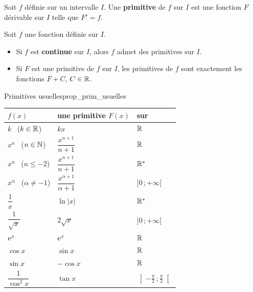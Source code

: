 \begin{definition}
	Soit $f$ définie sur un intervalle $I$. Une \textbf{primitive} de $f$
	sur $I$ est une fonction $F$ dérivable sur $I$ telle que $F'=f$.
\end{definition}

\begin{theoreme}
	Soit $f$ une fonction définie sur $I$.
	\begin{itemize}[label=\textbullet]
		\item Si $f$ est \textbf{continue} sur $I$, alors $f$ admet des
		primitives sur $I$.
		\item Si $F$ est une primitive de $f$ sur $I$, les primitives de $f$ sont
		exactement les fonctions $F+C$, $C\in\mathbb{R}$.
	\end{itemize}
\end{theoreme}

\begin{propriete}{Primitives usuelles}{prop_prim_usuelles}
	\begin{center}
	\renewcommand{\arraystretch}{2.0}
	\setlength{\tabcolsep}{5pt}
	\begin{tabular}{>{\centering\arraybackslash}p{2.9cm}
	                >{\centering\arraybackslash}p{2.6cm}
	                >{\centering\arraybackslash}p{2.7cm}}
	\hline
	$f(x)$ & une primitive $F(x)$ & sur \\
	\hline
	$k$ \ ($k\in\mathbb{R}$)                & $kx$                       & $\mathbb{R}$ \\
	$x^{n}$ \ ($n\in\mathbb{N}$)           & $\dfrac{x^{n+1}}{n+1}$     & $\mathbb{R}$ \\
	$x^{n}$ \ ($n\leq-2$)          & $\dfrac{x^{n+1}}{n+1}$     & $\mathbb{R}^*$ \\
	$x^{\alpha}$ \ ($\alpha\neq-1$) & $\dfrac{x^{\alpha+1}}{\alpha+1}$ & $]0\,;+\infty[$ \\
	$\dfrac{1}{x}$                 & $\ln|x|$                   & $\mathbb{R}^*$ \\
	$\dfrac{1}{\sqrt{x}}$          & $2\sqrt{x}$                & $]0\,;+\infty[$ \\
	$\mathrm{e}^{x}$                       & $\mathrm{e}^{x}$                   & $\mathbb{R}$ \\
	$\cos x$                       & $\sin x$                   & $\mathbb{R}$ \\
	$\sin x$                       & $-\cos x$                  & $\mathbb{R}$ \\
	$\dfrac{1}{\cos^{2}x}$         & $\tan x$                   & $\left]-\tfrac{\pi}{2}\,;\tfrac{\pi}{2}\right[$ \\
	\hline
	\end{tabular}
	\end{center}
\end{propriete}

